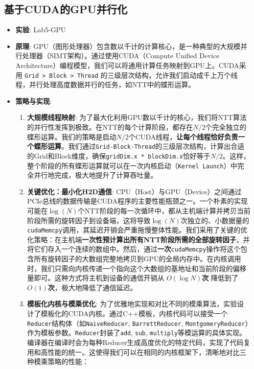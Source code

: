 \documentclass[a4paper]{article}
\begin{document}
\subsection{基于CUDA的GPU并行化}
\begin{itemize}
    \item \textbf{实验}: Lab5-GPU
    \item \textbf{原理}: GPU（图形处理器）包含数以千计的计算核心，是一种典型的大规模并行处理器（SIMT架构）。通过使用CUDA（Compute Unified Device Architecture）编程模型，我们可以将通用计算任务映射到GPU上。CUDA采用 \texttt{Grid > Block > Thread} 的三级层次结构，允许我们启动成千上万个线程，并行处理高度数据并行的任务，如NTT中的蝶形运算。
    \item \textbf{策略与实现}:
    \begin{enumerate}
        \item \textbf{大规模线程映射}: 为了最大化利用GPU数以千计的核心，我们将NTT算法的并行性发挥到极致。在NTT的每个计算阶段，都存在$N/2$个完全独立的蝶形运算。我们的策略是启动$N/2$个CUDA线程，\textbf{让每个线程恰好负责一个蝶形运算}。我们通过\texttt{Grid-Block-Thread}的三级层次结构，计算出合适的Grid和Block维度，确保\texttt{gridDim.x * blockDim.x}恰好等于$N/2$。这样，整个阶段的所有蝶形运算就可以在一次内核启动（\texttt{Kernel Launch}）中完全并行地完成，极大地提升了计算吞吐量。
        \item \textbf{关键优化：最小化H2D通信}: CPU（Host）与GPU（Device）之间通过PCIe总线的数据传输是CUDA程序的主要性能瓶颈之一。一个朴素的实现可能在$\log(N)$个NTT阶段的每一次循环中，都从主机端计算并拷贝当前阶段所需的旋转因子到设备端，这将导致$\log(N)$次独立的、小数据量的\texttt{cudaMemcpy}调用，其延迟开销会严重拖慢整体性能。我们采用了关键的优化策略：在主机端\textbf{一次性预计算出所有NTT阶段所需的全部旋转因子}，并将它们存入一个连续的数组中。然后，通过\textbf{一次}\texttt{cudaMemcpy}操作将这个包含所有旋转因子的大数组完整地拷贝到GPU的全局内存中。在内核调用时，我们只需向内核传递一个指向这个大数组的基地址和当前阶段的偏移量即可。这种方式将主机到设备的通信开销从 \textbf{$O(\log N)$次} 降低到了 \textbf{$O(1)$次}，极大地降低了通信延迟。
        \item \textbf{模板化内核与模乘优化}: 为了优雅地实现和对比不同的模乘算法，实验设计了模板化的CUDA内核。通过C++模板，内核代码可以接受一个\texttt{Reducer}结构体（如\texttt{NaiveReducer}, \texttt{BarrettReducer}, \texttt{MontgomeryReducer}）作为模板参数。\texttt{Reducer}封装了\texttt{add}, \texttt{sub}, \texttt{multiply}等模运算的具体实现。编译器在编译时会为每种Reducer生成高度优化的特定代码，实现了代码复用和高性能的统一。这使得我们可以在相同的内核框架下，清晰地对比三种模乘策略的性能：

\end{enumerate}
\end{itemize}
\end{document}

